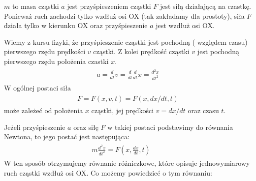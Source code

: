 \documentclass[a4paper,12pt,polish]{sphinxmanual}
\begin{document}
$m$  to masa cząstki
$a$ jest przyśpieszeniem cząstki
$F$ jest siłą działającą na czastkę.
Ponieważ ruch zachodzi tylko wzdłuż osi OX (tak zakładamy dla prostoty), siła  $F$  działa tylko w kierunku OX oraz przyśpieszenie $a$ jest wzdłuż osi OX.

Wiemy z kursu fizyki, że przyśpieszenie cząstki jest pochodną ( względem czasu) pierwszego rzędu prędkości $v$ cząstki. Z kolei prędkość cząstki $v$ jest pochodną pierwszego rzędu położenia czastki $x$.
\label{ch1/chI011:equation-eqn2}\begin{gather}
\begin{split}a= \frac{d}{dt} v= \frac{d}{dt} \frac{d}{dt} x = \frac{d^2x}{dt^2}\end{split}\label{ch1/chI011-eqn2}
\end{gather}
W ogólnej postaci siła
\label{ch1/chI011:equation-eqn3}\begin{gather}
\begin{split}F = F(x, v, t) = F(x, dx/dt, t)\end{split}\label{ch1/chI011-eqn3}
\end{gather}
może zależeć od położenia $x$ cząstki, jej prędkości $v=dx/dt$ oraz czasu $t$.

Jeżeli przyśpieszenie $a$ oraz siłę $F$ w takiej postaci podstawimy do równania Newtona, to jego postać jest następująca:
\label{ch1/chI011:equation-eqn4}\begin{gather}
\begin{split} m  \frac{d^2x}{dt^2} = F\left(x, \frac{dx}{dt}, t\right) \qquad\end{split}\label{ch1/chI011-eqn4}
\end{gather}
W ten sposób otrzymujemy równanie różniczkowe, które opisuje jednowymiarowy ruch cząstki wzdłuż osi OX.  Co możemy powiedzieć o tym równaniu:
\end{document}

